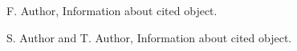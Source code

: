 \documentclass{iosart2x}
\begin{document}


\begin{thebibliography}{0}

 F. Author, Information about cited object.

 S. Author and T. Author, Information about cited object.

\end{thebibliography}
\end{document}
